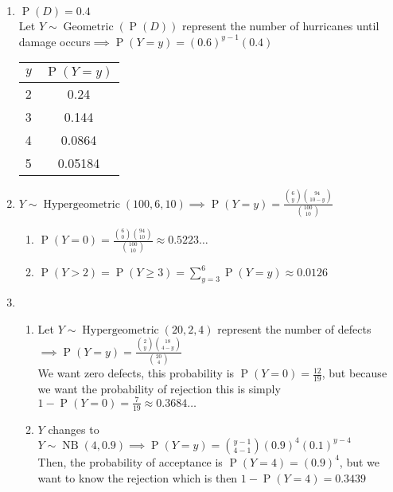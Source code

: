 \documentclass{article}
\newcommand{\pr}[1]{\operatorname{P}(#1)}
\newcommand{\geodist}[2]{#1 \sim \operatorname{Geometric}(#2)}
\newcommand{\nbinomdist}[3]{#1 \sim \operatorname{NB}(#2, #3)}
\newcommand{\hypegeodist}[4]{#1 \sim \operatorname{Hypergeometric}(#2, #3, #4)}
\begin{document}
\begin{enumerate}
  \item $\pr{D} = 0.4$\\
  Let $\geodist{Y}{\pr{D}}$ represent the number of hurricanes until damage occurs$\implies 
  \pr{Y=y} = (0.6)^{y-1}(0.4)$\\
  \begin{tabular}{|c|c|}
    \hline
    $y$ & $\pr{Y=y}$\\\hline
    2 & 0.24\\\hline
    3 & 0.144\\\hline
    4 & 0.0864\\\hline
    5 & 0.05184\\\hline
  \end{tabular}
  
  \item $\hypegeodist{Y}{100}{6}{10} \implies \pr{Y=y} = 
  \frac{\binom{6}{y}\binom{94}{10-y}}{\binom{100}{10}}$
  \begin{enumerate}
    \item $\pr{Y=0} = \frac{\binom{6}{0}\binom{94}{10}}{\binom{100}{10}} \approx 0.5223\ldots$
    \item $\pr{Y > 2} = \pr{Y \geq 3} = \sum_{y=3}^{6}\pr{Y=y} \approx 0.0126$
  \end{enumerate}

  \item \begin{enumerate}
    \item Let $\hypegeodist{Y}{20}{2}{4}$ represent the number of defects$\implies 
    \pr{Y=y} = \frac{\binom{2}{y}\binom{18}{4-y}}{\binom{20}{4}}$\\
    We want zero defects, this probability is $\pr{Y=0} = \frac{12}{19}$, 
    but because we want the probability of rejection this
    is simply $1 - \pr{Y=0} = \frac{7}{19} \approx 0.3684\ldots$ 
    \item $Y$ changes to $\nbinomdist{Y}{4}{0.9} \implies 
    \pr{Y=y} = \binom{y-1}{4-1}(0.9)^4(0.1)^{y-4}$\\
    Then, the probability of acceptance is $\pr{Y=4} = (0.9)^4$,
    but we want to know the rejection which is then $1 - \pr{Y=4} = 0.3439$
  \end{enumerate}
  

\end{enumerate}
\end{document}
